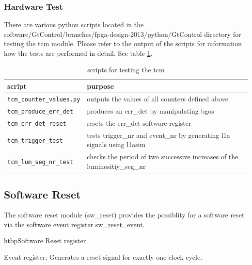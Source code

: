 \subsubsection{Hardware Test}
There are various python scripts located in the software/GtControl/branches/fpga-design-2013/python/GtControl directory for testing the tcm module. Please refer to the output of the scripts for information how the tests are performed in detail. See table \ref{tab:tcm_hw_test}.
\begin{table}[ht]
\vspace{5mm}
\begin{scriptsize}
\begin{tabular}{|p{5cm}|p{10cm}|}
\hline
script                         &purpose    \\ \hline
\verb|tcm_counter_values.py|   &outputs the values of all counters defined above    \\ \hline
\verb|tcm_produce_err_det|     &produces an err\_det by manipulating bgos \\ \hline
\verb|tcm_err_det_reset|       &resets the err\_det software register \\ \hline
\verb|tcm_trigger_test|        &tests trigger\_nr and event\_nr by generating l1a signals using l1asim \\ \hline
\verb|tcm_lum_seg_nr_test|    &checks the period of two successive increases of the luminositiy\_seg\_nr \\ \hline
\end{tabular}\caption{scripts for testing the tcm}\label{tab:tcm_hw_test}
\end{scriptsize}
\end{table}

% 
%  

\subsection{Software Reset} \label{sec:software_reset}
The software reset module (sw\_reset) provides the possiblity for a software reset via the software event register sw\_reset\_event.

\begin{register}{htbp}{Software Reset register}{}%
	\label{tcm_ctrl_reg}%
	\regnewline%

	\begin{regdesc}
	\begin{reglist}
		\item [sw\_reset\_event] Event register: Generates a reset signal for exactly one clock cycle.
	\end{reglist}
	\end{regdesc}
\end{register}

\clearpage






